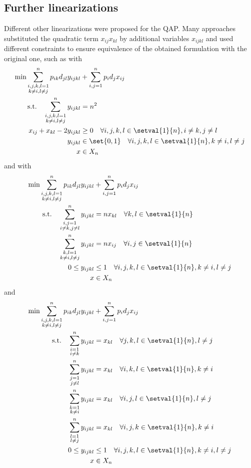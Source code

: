 \subsection{Further linearizations}

Different other linearizations were proposed for the QAP. Many approaches substituted the quadratic term $x_{ij}x_{kl}$ by additional variables $x_{ijkl}$ and used different constraints to ensure equivalence of the obtained formulation with the original one, such as \cite{MR0152361} with
\begin{align*}
	\min\sum_{\substack{i,j,k,l = 1\\k\neq i, l\neq j}}^n p_{ik}d_{jl}y_{ijkl} & +\sum_{i,j = 1}^n p_id_jx_{ij}\\
	\text{s.t.}\quad \sum_{\substack{i,j,k,l = 1\\k\neq i, l\neq j}}^n y_{ijkl}&=n^2\\
	x_{ij}+x_{kl}-2y_{ijkl}&\geq 0\quad\forall i,j,k,l \in\setval{1}{n}, i\neq k,j\neq l\\
	y_{ijkl}&\in\set{0,1}\quad\forall i,j,k,l \in\setval{1}{n}, k\neq i, l\neq j\\
	x&\in X_n
\end{align*}
and \cite{MR678819} with
\begin{align*}
	\min\sum_{\substack{i,j,k,l = 1\\k\neq i, l\neq j}}^n p_{ik}d_{jl}y_{ijkl} & +\sum_{i,j = 1}^n p_id_jx_{ij}\\
	\text{s.t.}\quad \sum_{\substack{i,j = 1\\i\neq k, j\neq l}}^n y_{ijkl}&=n x_{kl}\quad\forall k,l\in\setval{1}{n}\\
	\sum_{\substack{k,l = 1\\k\neq i, l\neq j}}^n y_{ijkl}&=n x_{ij}\quad\forall i,j\in\setval{1}{n}\\
	0\leq y_{ijkl}&\leq 1\quad\forall i,j,k,l \in\setval{1}{n}, k\neq i, l\neq j\\
	x&\in X_n
\end{align*} and 
{\allowdisplaybreaks
\begin{align*}
	\min\sum_{\substack{i,j,k,l = 1\\k\neq i, l\neq j}}^n p_{ik}d_{jl}y_{ijkl} & +\sum_{i,j = 1}^n p_id_jx_{ij}\\
	\text{s.t.}\quad \sum_{\substack{i = 1\\i\neq k}}^n y_{ijkl}&=x_{kl}\quad\forall j,k,l\in\setval{1}{n}, l\neq j\\
	\sum_{\substack{j = 1\\j\neq l}}^n y_{ijkl}&=x_{kl}\quad\forall i,k,l\in\setval{1}{n}, k\neq i\\
	\sum_{\substack{k = 1\\k\neq i}}^n y_{ijkl}&=x_{kl}\quad\forall i,j,l\in\setval{1}{n}, l\neq j\\
	\sum_{\substack{l = 1\\l\neq j}}^n y_{ijkl}&=x_{kl}\quad\forall i,j,k\in\setval{1}{n}, k\neq i\\
	0\leq y_{ijkl}&\leq 1\quad\forall i,j,k,l \in\setval{1}{n}, k\neq i, l\neq j\\
	x&\in X_n
\end{align*}}

